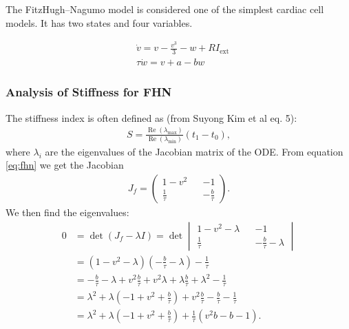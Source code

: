 The FitzHugh–Nagumo model is considered one of the simplest cardiac cell models. It has two states and four variables.


\begin{align}\label{eq:fhn} %
    &\dot{v}=v-\frac{v^{3}}{3}-w+R I_{\mathrm{ext}} \\
    &\tau \dot{w}=v+a-b w
\end{align}


\subsubsection{Analysis of Stiffness for FHN}

The stiffness index is often defined as (from Suyong Kim et al eq. 5):
\begin{align}
S = \frac{\operatorname{Re}\left(\lambda_{\max }\right)}{\operatorname{Re}\left(\lambda_{\min }\right)}\left(t_{1}-t_{0}\right),
\end{align}
where $\lambda_i$ are the eigenvalues of the Jacobian matrix of the ODE. From equation \ref{eq:fhn} we get the Jacobian
\begin{align}
J_f = \begin{pmatrix} %
	1 - v^2 && -1 \\
	\frac{1}{\tau} && - \frac{b}{\tau} 
\end{pmatrix}.\end{align}
We then find the eigenvalues:
\begin{align}
0 &= \det (J_f - \lambda I) 
= \det \begin{vmatrix}
	1 - v^2 -\lambda && -1 \\
	\frac{1}{\tau} && - \frac{b}{\tau} -\lambda
\end{vmatrix} \\
&= \left( 1-v^2-\lambda\right)  \left( -\frac{b}{\tau} -\lambda \right) - \frac{1}{\tau} \\
&= -\frac{b}{\tau} - \lambda + v^2 \frac{b}{\tau} + v^2\lambda + \lambda \frac{b}{\tau} + \lambda^2 - \frac{1}{\tau} \\
&= \lambda^2 + \lambda \left( -1 + v^2 + \frac{b}{\tau} \right) + v^2\frac{b}{\tau} - \frac{b}{\tau} - \frac{1}{\tau} \\
&= \lambda^2 + \lambda \left( -1 + v^2 + \frac{b}{\tau} \right) + \frac{1}{\tau} \left(  v^2 b - b - 1 \right).
\end{align}

